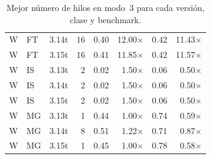 \begin{table}[htbp]
{\begin{tabular}{lllrrrrr}
W & FT & 3.14t & 16 & 0.40 & 12.00$\times$ & 0.42 & 11.43$\times$ \\
W & FT & 3.15t & 16 & 0.41 & 11.85$\times$ & 0.42 & 11.57$\times$ \\
W & IS & 3.13t & 2 & 0.02 & 1.50$\times$ & 0.06 & 0.50$\times$ \\
W & IS & 3.14t & 2 & 0.02 & 1.50$\times$ & 0.06 & 0.50$\times$ \\
W & IS & 3.15t & 2 & 0.02 & 1.50$\times$ & 0.06 & 0.50$\times$ \\
W & MG & 3.13t & 1 & 0.44 & 1.00$\times$ & 0.74 & 0.59$\times$ \\
W & MG & 3.14t & 8 & 0.51 & 1.22$\times$ & 0.71 & 0.87$\times$ \\
W & MG & 3.15t & 1 & 0.45 & 1.00$\times$ & 0.78 & 0.58$\times$ \\
\hline
\end{tabular}
}
\caption{Mejor número de hilos en modo~3 para cada versión, clase y benchmark.}
\label{tab:versiones-mode3-optimos}
\end{table}
